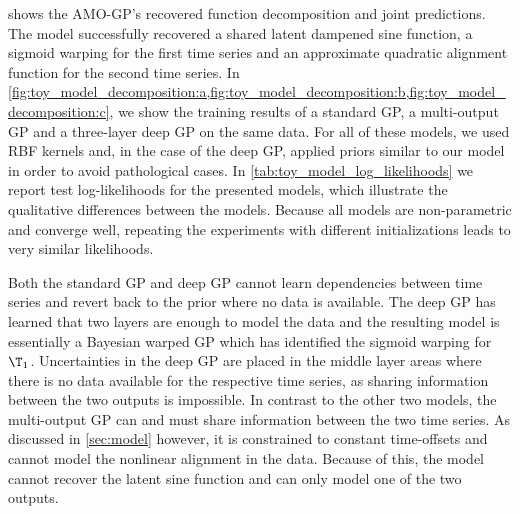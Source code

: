 \documentclass{article}
\begin{document}
 shows the AMO-GP's recovered function decomposition and joint predictions.
The model successfully recovered a shared latent dampened sine function, a sigmoid warping for the first time series and an approximate quadratic alignment function for the second time series.
In \cref{fig:toy_model_decomposition:a,fig:toy_model_decomposition:b,fig:toy_model_decomposition:c}, we show the training results of a standard GP, a multi-output GP and a three-layer deep GP on the same data.
For all of these models, we used RBF kernels and, in the case of the deep GP, applied priors similar to our model in order to avoid pathological cases.
In \cref{tab:toy_model_log_likelihoods} we report test log-likelihoods for the presented models, which illustrate the qualitative differences between the models.
Because all models are non-parametric and converge well, repeating the experiments with different initializations leads to very similar likelihoods.

Both the standard GP and deep GP cannot learn dependencies between time series and revert back to the prior where no data is available.
The deep GP has learned that two layers are enough to model the data and the resulting model is essentially a Bayesian warped GP which has identified the sigmoid warping for $\T_1$.
Uncertainties in the deep GP are placed in the middle layer areas where there is no data available for the respective time series, as sharing information between the two outputs is impossible.
In contrast to the other two models, the multi-output GP can and must share information between the two time series.
As discussed in \cref{sec:model} however, it is constrained to constant time-offsets and cannot model the nonlinear alignment in the data.
Because of this, the model cannot recover the latent sine function and can only model one of the two outputs.
\end{document}
